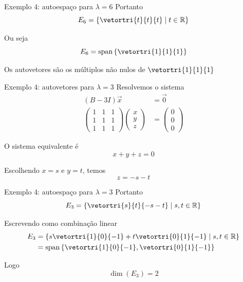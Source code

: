 \begin{resolution}{Exemplo 4: autoespaço para $\lambda=6$}
    Portanto
    \[
        E_{6}=
        \left\{
            \vetortri{t}{t}{t}
            \mid t\in\mathbb{R}
        \right\}
    \]

    Ou seja
    \[
        E_{6}=
        \operatorname{span}
        \left\{\vetortri{1}{1}{1}\right\}
    \]

    Os autovetores são os múltiplos não nulos de $\vetortri{1}{1}{1}$
\end{resolution}

\begin{resolution}{Exemplo 4: autovetores para $\lambda=3$}
    Resolvemos o sistema
    \begin{align*}
        (B-3I)\vec{x}&=\vec{0}\\
        \begin{pmatrix}
            1 & 1 & 1\\
            1 & 1 & 1\\
            1 & 1 & 1
        \end{pmatrix}
        \begin{pmatrix}
            x\\y\\z
        \end{pmatrix}
        &=
        \begin{pmatrix}
            0\\0\\0
        \end{pmatrix}
    \end{align*}

    O sistema equivalente é
    \[
        x+y+z=0
    \]

    Escolhendo $x=s$ e $y=t$, temos
    \[
        z=-s-t
    \]
\end{resolution}

\begin{resolution}{Exemplo 4: autoespaço para $\lambda=3$}
    Portanto
    \[
        E_{3}=
        \left\{
            \vetortri{s}{t}{-s-t}
            \mid s,t\in\mathbb{R}
        \right\}
    \]

    Escrevendo como combinação linear
    \begin{align*}
        E_{3}
        &=
        \left\{
            s\vetortri{1}{0}{-1}
            +
            t\vetortri{0}{1}{-1}
            \mid s,t\in\mathbb{R}
        \right\}\\
        &=
        \operatorname{span}
        \left\{
            \vetortri{1}{0}{-1}
            ,
            \vetortri{0}{1}{-1}
        \right\}
    \end{align*}

    Logo
    \[
        \dim(E_{3})=2
    \]
\end{resolution}

